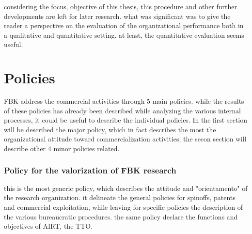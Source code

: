 considering the focus, objective of this thesis, this procedure and other further developments are left for later research. what was significant was to give the reader a perspective on the evaluation of the organizational performance both in a qualitative and quantitative setting. at least, the quantitative evaluation seems useful.

\section{Policies}

FBK address the commercial activities through 5 main policies. while the results of these policies has already been described while analyzing the various internal processes, it could be useful to describe the individual policies. In the first section will be described the major policy, which in fact describes the most the organizational attitude toward commercialization activities; the secon section will describe other 4 minor policies related.

\subsubsection{Policy for the valorization of FBK research}

this is the most generic policy, which describes the attitude and "orientamento" of the research organization. it delineate the general policies for spinoffs, patents and commercial exploitation, while leaving for specific policies the description of the various bureaucratic procedures. the same policy declare the functions and objectives of AIRT, the TTO.

